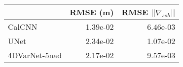 \begin{tabular}{lrr}
\toprule
 & RMSE (m) & RMSE $|| \nabla_{ssh} ||$ \\
\midrule
CalCNN & 1.39e-02 & 6.46e-03 \\
UNet & 2.34e-02 & 1.07e-02 \\
4DVarNet-5nad & 2.17e-02 & 9.57e-03 \\
\bottomrule
\end{tabular}
